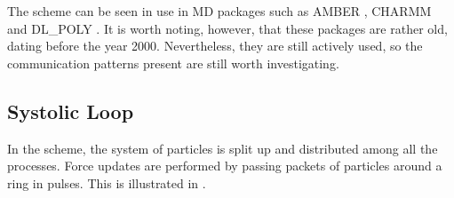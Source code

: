 The \replicateddata{} scheme can be seen in use in MD packages such as
AMBER \cite{pearlman1995amber}, CHARMM \cite{brooks1983charmm} and
DL\_POLY \cite{smith1996dl_poly_2}.
%
It is worth noting, however, that these packages are rather old,
dating before the year 2000.
%
Nevertheless, they are still actively used, so the communication
patterns present are still worth investigating.




\subsection{Systolic Loop}
\label{sec:background:subsec:systolic_loop}

%
In the \systolicloop{} scheme, the system of particles is
split up and distributed among all the processes.
%
Force updates are performed by
passing packets of particles around a ring in pulses.
%
This is illustrated in .

